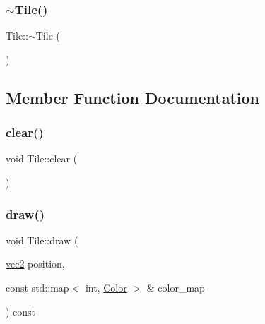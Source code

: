 \mbox{\label{classTile_a98634abbd93fa13d0578d7103202d03d}} 
\subsubsection{\texorpdfstring{$\sim$\+Tile()}{~Tile()}}
{\footnotesize\ttfamily Tile\+::$\sim$\+Tile (\begin{DoxyParamCaption}{ }\end{DoxyParamCaption})\hspace{0.3cm}{\ttfamily [inline]}}



\subsection{Member Function Documentation}
\mbox{\label{classTile_a8f482bab4aa537311f8948f225c915a4}} 
\subsubsection{\texorpdfstring{clear()}{clear()}}
{\footnotesize\ttfamily void Tile\+::clear (\begin{DoxyParamCaption}{ }\end{DoxyParamCaption})\hspace{0.3cm}{\ttfamily [inline]}}

\mbox{\label{classTile_ab0e0884c673e59a98e59118fa92127bc}} 
\subsubsection{\texorpdfstring{draw()}{draw()}}
{\footnotesize\ttfamily void Tile\+::draw (\begin{DoxyParamCaption}\item[{\hyperlink{structvec2}{vec2}}]{position,  }\item[{const std\+::map$<$ int, \hyperlink{structColor}{Color} $>$ \&}]{color\+\_\+map }\end{DoxyParamCaption}) const}

\mbox{\label{classTile_a60af31824ef9a5992f9e17b13df76c60}} 
